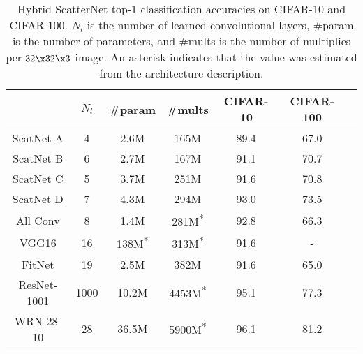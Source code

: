 \begin{table}
  \centering
  \caption{Hybrid ScatterNet top-1 classification accuracies on CIFAR-10 and CIFAR-100. 
  $N_l$ is the number of learned convolutional layers, \#param is the number of
  parameters, and \#mults is the number of multiplies per $32\x 32\x 3$ image. An asterisk indicates
  that the value was estimated from the architecture description.}\label{tab:hybrid_scat}
  \hspace{-10pt}
  \begin{tabular}{c|ccc|ccc}
    & $N_l$ &\#param&\#mults&CIFAR-10&CIFAR-100\\ \hline 
    ScatNet A & 4 & 2.6M & 165M & 89.4 & 67.0 \\ 
    ScatNet B & 6 & 2.7M & 167M & 91.1  & 70.7 \\ %
    ScatNet C & 5 & 3.7M & 251M & 91.6 & 70.8  \\ %
    ScatNet D & 7 & 4.3M & 294M & 93.0 & 73.5  \\\hline %
    All Conv\cite{springenberg_striving_2014-3} & 8 & 1.4M & 281M\textsuperscript{*} & 92.8 & 66.3 \\ %
    VGG16\cite{liu_very_2015} & 16 & 138M\textsuperscript{*} & 313M\textsuperscript{*}  & 91.6 & -  \\ 
    FitNet\cite{romero_fitnets:_2014} & 19 & 2.5M & 382M & 91.6 & 65.0 \\ %
    ResNet-1001\cite{he_identity_2016} & 1000 & 10.2M & 4453M\textsuperscript{*}& 95.1 & 77.3 \\ %
    WRN-28-10\cite{zagoruyko_wide_2016} & 28 & 36.5M & 5900M\textsuperscript{*} & 96.1 & 81.2 \\ %
  \end{tabular}
\end{table}

